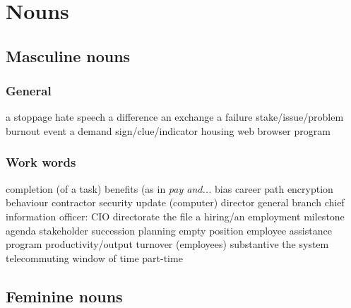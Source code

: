 \section{Nouns}
\subsection*{Masculine nouns}
\subsubsection*{General}
   {a stoppage}
   {hate speech}
   {a difference}
   {an exchange}
   {a failure}
   {stake/issue/problem}
 {burnout}
   {event}
   {a demand}
   {sign/clue/indicator}
   {housing}
   {web browser}
   {program}
\subsubsection*{Work words}
   {completion (of a task)}
   {benefits (as in {\em pay and...}}
   {bias}
   {career path}
   {encryption}
   {behaviour}
   {contractor}
   {security update (computer)}
   {director general}
   {branch}
   {chief information officer: CIO}
   {directorate}
   {the file}
   {a hiring/an employment}
   {milestone}
   {agenda}
   {stakeholder}
   {succession planning}
   {empty position}
   {employee assistance program}
   {productivity/output}
   {turnover (employees)}
   {substantive}
   {the system}
   {telecommuting}
   {window of time}
   {part-time}
\subsection*{Feminine nouns}
